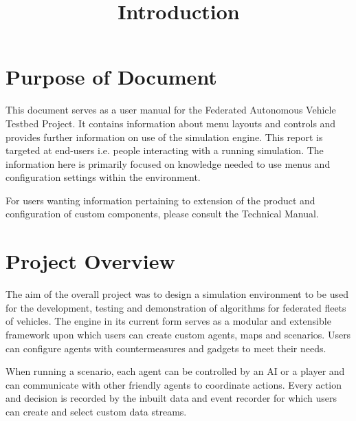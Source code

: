 \documentclass[../main.tex]{subfiles}
\title{Introduction}
\begin{document}
\section{Purpose of Document}
This document serves as a user manual for the Federated Autonomous Vehicle Testbed Project. It contains information about menu layouts and controls and provides further information on use of the simulation engine. This report is targeted at end-users i.e. people interacting with a running simulation. The information here is primarily focused on knowledge needed to use menus and configuration settings within the environment.

For users wanting information pertaining to extension of the product and configuration of custom components, please consult the Technical Manual.

\section{Project Overview}
The aim of the overall project was to design a simulation environment to be used for the development, testing and demonstration of algorithms for federated fleets of vehicles. The engine in its current form serves as a modular and extensible framework upon which users can create custom agents, maps and scenarios. Users can configure agents with countermeasures and gadgets to meet their needs. 

When running a scenario, each agent can be controlled by an AI or a player and can communicate with other friendly agents to coordinate actions. Every action and decision is recorded by the inbuilt data and event recorder for which users can create and select custom data streams.
\end{document}
